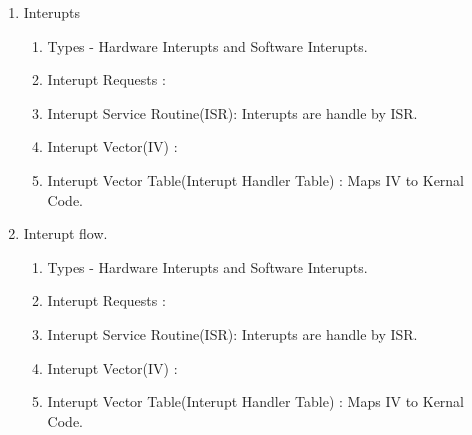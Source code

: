 \begin{enumerate}
  \item Interupts
  \begin{enumerate}
        \item Types - Hardware Interupts and Software Interupts.
        \item Interupt Requests :
        \item Interupt Service Routine(ISR): Interupts are handle by ISR.
        \item Interupt Vector(IV) :
        \item Interupt Vector Table(Interupt Handler Table) : Maps IV to Kernal Code.
  \end{enumerate}

  \item Interupt flow.
  \begin{enumerate}
        \item Types - Hardware Interupts and Software Interupts.
        \item Interupt Requests :
        \item Interupt Service Routine(ISR): Interupts are handle by ISR.
        \item Interupt Vector(IV) :
        \item Interupt Vector Table(Interupt Handler Table) : Maps IV to Kernal Code.
  \end{enumerate}


\end{enumerate}








